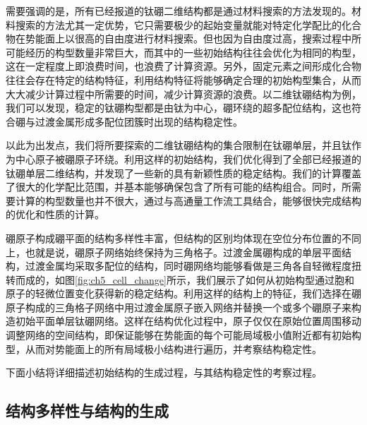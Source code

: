 需要强调的是，所有已经报道的钛硼二维结构都是通过材料搜索的方法发现的。材料搜索的方法尤其一定优势，它只需要极少的起始变量就能对特定化学配比的化合物在势能面上以很高的自由度进行材料搜索。但也因为自由度过高，搜索过程中所可能经历的构型数量非常巨大，而其中的一些初始结构往往会优化为相同的构型，这在一定程度上即浪费时间，也浪费了计算资源。另外，固定元素之间形成化合物往往会存在特定的结构特征，利用结构特征将能够确定合理的初始构型集合，从而大大减少计算过程中所需要的时间，减少计算资源的浪费。以二维钛硼结构为例，我们可以发现，稳定的钛硼构型都是由钛为中心，硼环绕的超多配位结构，这也符合硼与过渡金属形成多配位团簇时出现的结构稳定性。

以此为出发点，我们将所要探索的二维钛硼结构的集合限制在钛硼单层，并且钛作为中心原子被硼原子环绕。利用这样的初始结构，我们优化得到了全部已经报道的钛硼单层二维结构，并发现了一些新的具有新颖性质的稳定结构。我们的计算覆盖了很大的化学配比范围，并基本能够确保包含了所有可能的结构组合。同时，所需要计算的构型数量也并不很大，通过与高通量工作流工具结合，能够很快完成结构的优化和性质的计算。

硼原子构成硼平面的结构多样性丰富，但结构的区别均体现在空位分布位置的不同上，也就是说，硼原子网络始终保持为三角格子。过渡金属硼构成的单层平面结构，过渡金属均采取多配位的结构，同时硼网络均能够看做是三角各自轻微程度扭转而成的，如图\ref{fig:ch5_cell_change}所示，我们展示了如何从初始构型通过胞和原子的轻微位置变化获得新的稳定结构。利用这样的结构上的特征，我们选择在硼原子构成的三角格子网络中用过渡金属原子嵌入网络并替换一个或多个硼原子来构造初始平面单层钛硼网络。这样在结构优化过程中，原子仅仅在原始位置周围移动调整网络的空间结构，即保证能够在势能面的每个可能局域极小值附近都有初始构型，从而对势能面上的所有局域极小结构进行遍历，并考察结构稳定性。

下面小结将详细描述初始结构的生成过程，与其结构稳定性的考察过程。

\subsection{结构多样性与结构的生成}

